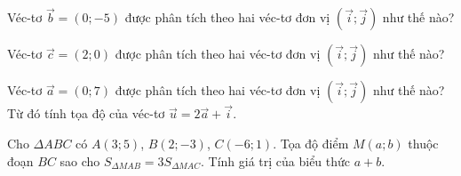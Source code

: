 \begin{bt}%
	Véc-tơ $\overrightarrow{b}=(0;-5)$ được phân tích theo hai véc-tơ đơn vị $\left(\overrightarrow{i};\overrightarrow{j}\right)$ như thế nào?
\end{bt}

\begin{bt}%
	Véc-tơ $\overrightarrow{c}=(2;0)$ được phân tích theo hai véc-tơ đơn vị $\left(\overrightarrow{i};\overrightarrow{j}\right)$ như thế nào?
\end{bt}

\begin{bt}%
	Véc-tơ $\overrightarrow{a}=(0;7)$ được phân tích theo hai véc-tơ đơn vị $\left(\overrightarrow{i};\overrightarrow{j}\right)$ như thế nào? Từ đó tính tọa độ của véc-tơ $\overrightarrow{u}=2\overrightarrow{a}+\overrightarrow{i}$.
\end{bt}

\begin{bt}%
	Cho $\Delta ABC$ có $A(3; 5)$, $B(2;-3)$, $C(-6; 1)$. Tọa độ điểm $M(a;b)$ thuộc đoạn $BC$ sao cho $S_{\Delta MAB}=3S_{\Delta MAC}$. Tính giá trị của biểu thức $a+b$.
\end{bt}

